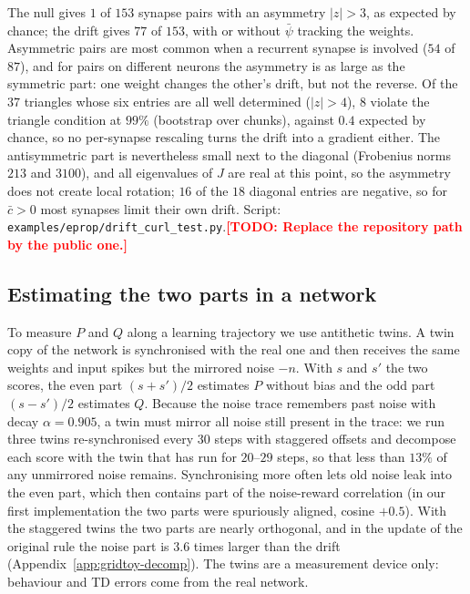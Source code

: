 \documentclass[10pt,twocolumn]{article}
\newcommand{\todo}[1]{\textcolor{red}{\bfseries[TODO: #1]}}
\begin{document}
The null gives $1$ of $153$ synapse pairs with an asymmetry $|z|>3$, as expected by
chance; the drift gives $77$ of $153$, with or without $\bar\psi$ tracking the
weights. Asymmetric pairs are most common when a recurrent synapse is involved ($54$ of
$87$), and for pairs on different neurons the asymmetry is as large as the symmetric
part: one weight changes the other's drift, but not the reverse. Of the $37$
triangles whose six entries are all well determined ($|z|>4$), $8$ violate the
triangle condition at $99\%$ (bootstrap over chunks), against $0.4$ expected by
chance, so no per-synapse rescaling turns the drift into a gradient either. The
antisymmetric part is nevertheless small next to the diagonal (Frobenius norms $213$
and $3100$), and all eigenvalues of $J$ are real at this point, so the asymmetry does
not create local rotation; $16$ of the $18$ diagonal entries are negative, so for
$\bar c>0$ most synapses limit their own drift. Script:
\texttt{examples/eprop/drift\_curl\_test.py}.\todo{Replace the repository path by the
public one.}

\subsection{Estimating the two parts in a network}
\label{app:decomp-twin}
To measure $P$ and $Q$ along a learning trajectory we use antithetic twins.
A twin copy of the network is synchronised with the real one and then receives the
same weights and input spikes but the mirrored noise $-n$. With $s$ and $s'$ the
two scores, the even part $(s+s')/2$ estimates $P$ without bias and the odd part
$(s-s')/2$ estimates $Q$. Because the noise trace remembers past noise with decay
$\alpha=0.905$, a twin must mirror all noise still present in the trace: we run
three twins re-synchronised every $30$ steps with staggered offsets and decompose
each score with the twin that has run for $20$--$29$ steps, so that less than
$13\%$ of any unmirrored noise remains. Synchronising more often lets old noise
leak into the even part, which then contains part of the noise-reward
correlation (in our first implementation the two parts were spuriously aligned,
cosine $+0.5$). With the staggered twins the two parts are nearly orthogonal, and in
the update of the original rule the noise part is $3.6$ times larger than the drift
(Appendix~\ref{app:gridtoy-decomp}). The twins are a measurement device only:
behaviour and TD errors come from the real network.
\end{document}
